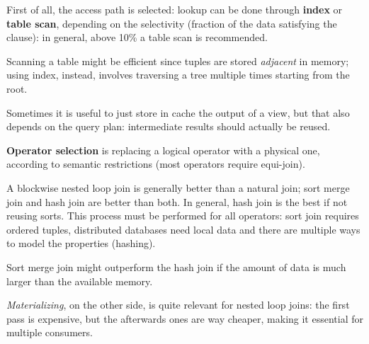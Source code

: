 First of all, the access path is selected: lookup can be done through \textbf{index} or \textbf{table scan}, depending on the selectivity (fraction of the data satisfying the clause): in general, above 10\% a table scan is recommended. 

Scanning a table might be efficient since tuples are stored \textit{adjacent} in memory; using index, instead, involves traversing a tree multiple times starting from the root. 

Sometimes it is useful to just store in cache the output of a view, but that also depends on the query plan: intermediate results should actually be reused.

\textbf{Operator selection} is replacing a logical operator with a physical one, according to semantic restrictions (most operators require equi-join).

A blockwise nested loop join is generally better than a natural join; sort merge join and hash join are better than both. In general, hash join is the best if not reusing sorts. This process must be performed for all operators: sort join requires ordered tuples, distributed databases need local data and there are multiple ways to model the properties (hashing).

Sort merge join might outperform the hash join if the amount of data is much larger than the available memory.

\textit{Materializing}, on the other side, is quite relevant for nested loop joins: the first pass is expensive, but the afterwards ones are way cheaper, making it essential for multiple consumers. 
